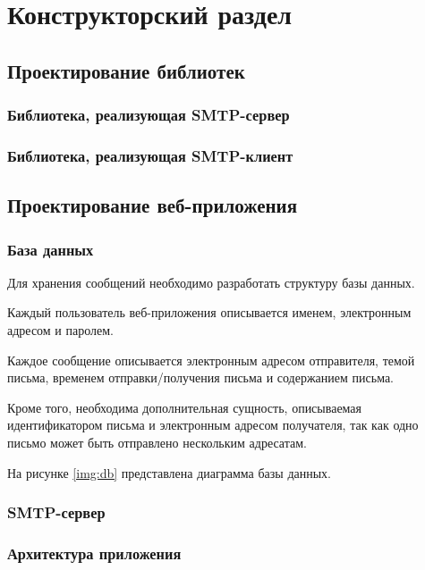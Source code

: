 \chapter{Конструкторский раздел}

\section{Проектирование библиотек}

\subsection{Библиотека, реализующая SMTP-сервер}

\subsection{Библиотека, реализующая SMTP-клиент}

\section{Проектирование веб-приложения}

\subsection{База данных}

Для хранения сообщений необходимо разработать структуру базы данных.

Каждый пользователь веб-приложения описывается именем, электронным адресом и паролем.

Каждое сообщение описывается электронным адресом отправителя, темой письма, временем отправки/получения письма и содержанием письма.

Кроме того, необходима дополнительная сущность, описываемая идентификатором письма и электронным адресом получателя, так как одно письмо может быть отправлено нескольким адресатам.

На рисунке \ref{img:db} представлена диаграмма базы данных.


\subsection{SMTP-сервер}

\subsection{Архитектура приложения}

